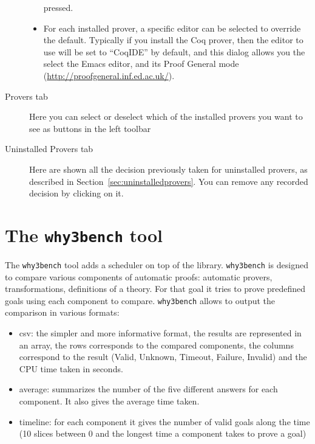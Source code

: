 \begin{description}
\begin{itemize}
  pressed.
\item For each installed prover, a specific editor can be selected to
  override the default. Typically if you install the Coq prover, then
  the editor to use will be set to ``CoqIDE'' by default, and this
  dialog allows you the select the Emacs editor, and its Proof General
  mode (\url{http://proofgeneral.inf.ed.ac.uk/}).
\end{itemize}
\item[\textsf{Provers} tab]
  Here you can select or deselect which of the installed provers you want to see
  as buttons in the left toolbar
\item[\textsf{Uninstalled Provers} tab] Here are shown all the
  decision previously taken for uninstalled provers, as described in
  Section~\ref{sec:uninstalledprovers}. You can remove any recorded
  decision by clicking on it.
\end{description}


\section{The \texttt{why3bench} tool}

The \texttt{why3bench} tool adds a scheduler on top of the \why
library. \texttt{why3bench} is designed to compare various components
of automatic proofs: automatic provers, transformations, definitions
of a theory. For that goal it tries to prove predefined goals using
each component to compare. \texttt{why3bench} allows to output the
comparison in various formats:
\begin{itemize}
\item csv: the simpler and more informative format, the results are
  represented in an array, the rows corresponds to the
  compared components, the columns correspond to the result
  (Valid, Unknown, Timeout, Failure, Invalid) and the CPU time taken in seconds.
\item average: summarizes the number of the five different answers
  for each component. It also gives the average time taken.
\item timeline: for each component it gives the number of valid goals
  along the time (10 slices between 0 and the longest time a component
  takes to prove a goal)
\end{itemize}

